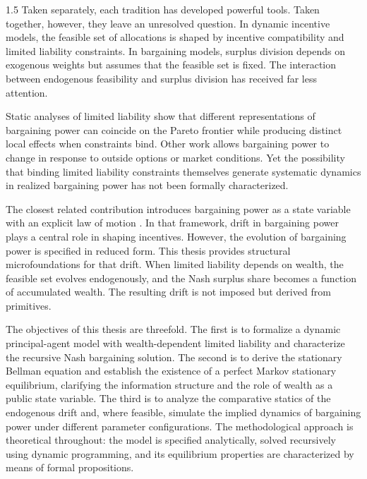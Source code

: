 \documentclass[12pt]{article}
\theoremstyle{definition}
\theoremstyle{plain}
\begin{document}
\begin{spacing}{1.5}
Taken separately, each tradition has developed powerful tools. Taken together, however, they leave an unresolved question. In dynamic incentive models, the feasible set of allocations is shaped by incentive compatibility and limited liability constraints. In bargaining models, surplus division depends on exogenous weights but assumes that the feasible set is fixed. The interaction between endogenous feasibility and surplus division has received far less attention.

Static analyses of limited liability show that different representations of bargaining power can coincide on the Pareto frontier while producing distinct local effects when constraints bind. Other work allows bargaining power to change in response to outside options or market conditions. Yet the possibility that binding limited liability constraints themselves generate systematic dynamics in realized bargaining power has not been formally characterized.

The closest related contribution introduces bargaining power as a state variable with an explicit law of motion \parencite{digiannatale2025}. In that framework, drift in bargaining power plays a central role in shaping incentives. However, the evolution of bargaining power is specified in reduced form. This thesis provides structural microfoundations for that drift. When limited liability depends on wealth, the feasible set evolves endogenously, and the Nash surplus share becomes a function of accumulated wealth. The resulting drift is not imposed but derived from primitives.

The objectives of this thesis are threefold. The first is to formalize a dynamic principal-agent model with wealth-dependent limited liability and characterize the recursive Nash bargaining solution. The second is to derive the stationary Bellman equation and establish the existence of a perfect Markov stationary equilibrium, clarifying the information structure and the role of wealth as a public state variable. The third is to analyze the comparative statics of the endogenous drift and, where feasible, simulate the implied dynamics of bargaining power under different parameter configurations. The methodological approach is theoretical throughout: the model is specified analytically, solved recursively using dynamic programming, and its equilibrium properties are characterized by means of formal propositions.


\end{spacing}
\end{document}

